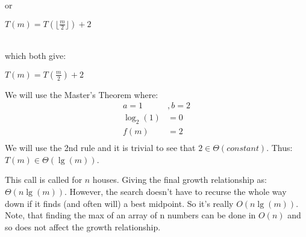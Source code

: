 \documentclass[12pt]{article}
\begin{document}
or\\
\centerline{ $T(m) = T(\lfloor \frac{m}{2} \rfloor ) + 2$}\\
which both give:\\
\centerline{ $T(m) = T(\frac{m}{2} ) + 2$}
We will use the Master's Theorem where: 
\begin{align*}
a  = 1 &,
 b  = 2   \\
 \log_2(1) & = 0 \\
f(m) & = 2 \\
\end{align*}
We will use the 2nd rule and it is trivial to see that $ 2 \in \Theta( constant) $.  Thus:\\
$T(m) \in \Theta( \lg(m) )$.

This call is called for $n$ houses.  Giving the final growth relationship as: $ \Theta(n\lg(m))$.  However, the search doesn't have to recurse the whole way down if it finds (and often will) a best midpoint.  So it's really $O( n\lg(m))$.  Note, that finding the max of an array of n numbers can be done in $O(n)$ and so does not affect the growth relationship.
\end{document}

